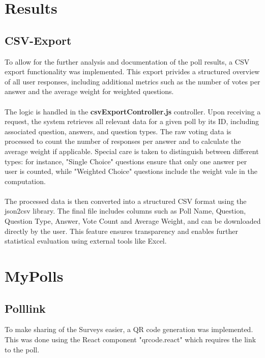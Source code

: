 \documentclass[a4paper,12pt]{report}
\begin{document}
\section{Results}
\subsection{CSV-Export}
To allow for the further analysis and documentation of the poll results, a CSV export functionality was implemented. This export privides a structured overview of all user responses, including additional metrics such as the number of votes per answer and the average weight for weighted questions.\\ \\
The logic is handled in the \textbf{csvExportController.js} controller. Upon receiving a request, the system retrieves all relevant data for a given poll by its ID, including associated question, answers, and question types. The raw voting data is processed to count the number of responses per answer and to calculate the average weight if applicable. Special care is taken to distinguish between different types: for instance, "Single Choice" questions ensure that only one answer per user is counted, while "Weighted Choice" questions include the weight vale in the computation.\\ \\
The processed data is then converted into a structured CSV format using the json2csv library. The final file includes columns such as Poll Name, Question, Question Type, Answer, Vote Count and Average Weight, and can be downloaded directly by the user. This feature ensures transparency and enables further statistical evaluation using external tools like Excel.\parencite{json2csv}
\section{MyPolls}
\subsection{Polllink}

To make sharing of the Surveys easier, a QR code generation was implemented. This was done using the React component "qrcode.react" which requires the link to the poll.\parencite{qrcode}
\end{document}
